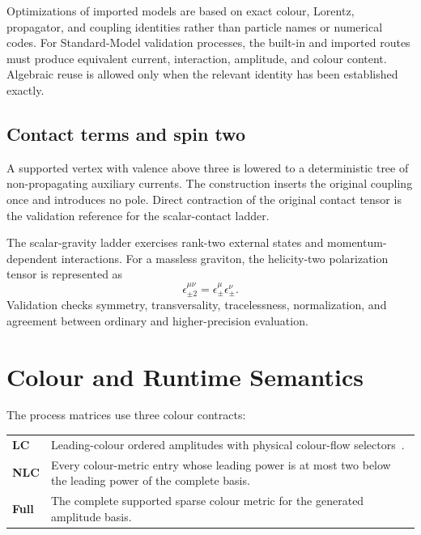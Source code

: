 \documentclass[10pt,letterpaper]{article}
\begin{document}
Optimizations of imported models are based on exact colour, Lorentz,
propagator, and coupling identities rather than particle names or numerical
codes. For Standard-Model validation processes, the built-in and imported
routes must produce equivalent current, interaction, amplitude, and colour
content. Algebraic reuse is allowed only when the relevant identity has been
established exactly.

\subsection{Contact terms and spin two}

A supported vertex with valence above three is lowered to a deterministic tree
of non-propagating auxiliary currents. The construction inserts the original
coupling once and introduces no pole. Direct contraction of the original
contact tensor is the validation reference for the scalar-contact ladder.

The scalar-gravity ladder exercises rank-two external states and
momentum-dependent interactions. For a massless graviton, the helicity-two
polarization tensor is represented as
\begin{equation}
  \epsilon^{\mu\nu}_{\pm 2}
  = \epsilon^{\mu}_{\pm}\epsilon^{\nu}_{\pm} .
\end{equation}
Validation checks symmetry, transversality, tracelessness, normalization, and
agreement between ordinary and higher-precision evaluation.

\section{Colour and Runtime Semantics}

The process matrices use three colour contracts:
\begin{center}
\begin{tabular}{@{}L{0.45in}L{5.85in}@{}}
\textbf{LC} & Leading-colour ordered amplitudes with physical colour-flow selectors~\cite{Maltoni2002}. \\
\textbf{NLC} & Every colour-metric entry whose leading power is at most two below the leading power of the complete basis. \\
\textbf{Full} & The complete supported sparse colour metric for the generated amplitude basis. \\
\end{tabular}
\end{center}
\end{document}
